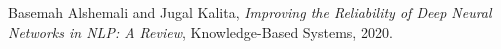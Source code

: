 \documentclass[lettersize,journal]{IEEEtran}
\begin{document}
\begin{thebibliography}{1}

Basemah Alshemali and Jugal Kalita, {\it{Improving the Reliability of Deep Neural Networks in NLP: A Review}}, Knowledge-Based Systems, 2020.

\end{thebibliography}
\end{document}
